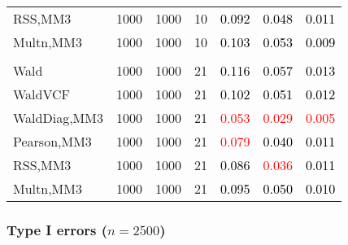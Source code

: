 \documentclass[
]{article}
\begin{document}
\begin{table}[H]
{\begin{tabular}[t]{lrrrrrr}
\hspace{1em}RSS,MM3 & 1000 & 1000 & 10 & \textcolor{black}{0.092} & \textcolor{black}{0.048} & \textcolor{black}{0.011}\\
\hspace{1em}Multn,MM3 & 1000 & 1000 & 10 & \textcolor{black}{0.103} & \textcolor{black}{0.053} & \textcolor{black}{0.009}\\
\addlinespace[0.3em]
\multicolumn{7}{l}{\textbf{3F 15V}}\\
\hspace{1em}Wald & 1000 & 1000 & 21 & \textcolor{black}{0.116} & \textcolor{black}{0.057} & \textcolor{black}{0.013}\\
\hspace{1em}WaldVCF & 1000 & 1000 & 21 & \textcolor{black}{0.102} & \textcolor{black}{0.051} & \textcolor{black}{0.012}\\
\hspace{1em}WaldDiag,MM3 & 1000 & 1000 & 21 & \textcolor{red}{0.053} & \textcolor{red}{0.029} & \textcolor{red}{0.005}\\
\hspace{1em}Pearson,MM3 & 1000 & 1000 & 21 & \textcolor{red}{0.079} & \textcolor{black}{0.040} & \textcolor{black}{0.011}\\
\hspace{1em}RSS,MM3 & 1000 & 1000 & 21 & \textcolor{black}{0.086} & \textcolor{red}{0.036} & \textcolor{black}{0.011}\\
\hspace{1em}Multn,MM3 & 1000 & 1000 & 21 & \textcolor{black}{0.095} & \textcolor{black}{0.050} & \textcolor{black}{0.010}\\
\bottomrule
\end{tabular}}
\endgroup{}
\end{table}

\subsubsection{\texorpdfstring{Type I errors
(\(n=2500\))}{Type I errors (n=2500)}}\label{type-i-errors-n2500-2}
\end{document}
